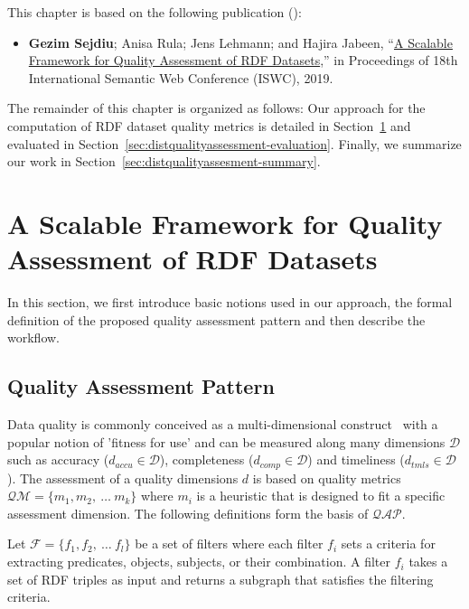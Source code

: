 This chapter is based on the following publication (\cite{sejdiu-2019-sansa-dist-quality-assessment-iswc}):
\begin{itemize}
     \item \textbf{Gezim Sejdiu}; Anisa Rula; Jens Lehmann; and Hajira Jabeen, “\href{http://jens-lehmann.org/files/2019/iswc_dist_quality_assessment.pdf}{A Scalable Framework for Quality Assessment of RDF Datasets},” in Proceedings of 18th International Semantic Web Conference (ISWC), 2019.
\end{itemize}

The remainder of this chapter is organized as follows:
Our approach for the computation of \gls{RDF} dataset quality metrics is detailed in Section~\ref{sec:distqualityassessment-approach} and evaluated in Section~\ref{sec:distqualityassessment-evaluation}.
Finally, we summarize our work in  Section~\ref{sec:distqualityassesment-summary}.

\section{A Scalable Framework for Quality Assessment of RDF Datasets}
\label{sec:distqualityassessment-approach}
In this section, we first introduce basic notions used in our approach, the formal definition of the proposed quality assessment pattern and then describe the workflow. 

\subsection{Quality Assessment Pattern}
Data quality is commonly conceived as a multi-dimensional construct~\cite{BatiniS16} with a popular notion of 'fitness for use' and can be measured along many dimensions $\mathcal{D}$ such as accuracy ($d_{accu} \in \mathcal{D}$), completeness ($d_{comp} \in \mathcal{D}$) and timeliness ($d_{tmls} \in \mathcal{D}$). 
The assessment of a quality dimensions $d$ is based on quality metrics $\mathcal{QM} = \{m_1,m_2,~\dots~m_k\}$ where $m_i$ is a heuristic that is designed to fit a specific assessment dimension. 
The following definitions form the basis of $\mathcal{QAP}$.

\begin{definition}[Filter]
Let $\mathcal{F} = \{f_1,f_2,~\dots~f_l\}$ be a set of filters where each filter $f_i$ sets a criteria for extracting predicates, objects, subjects, or their combination.
A filter $f_i$ takes a set of \gls{RDF} triples as input and returns a subgraph that satisfies the filtering criteria.
\end{definition}

